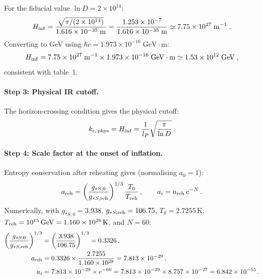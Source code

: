 For the fiducial value $\ln D = 2 \times 10^{14}$:
\begin{equation}
  H_{\rm inf} = \frac{\sqrt{\pi/(2\times 10^{14})}}{1.616\times 10^{-35}\;\mathrm{m}}
  = \frac{1.253\times 10^{-7}}{1.616\times 10^{-35}\;\mathrm{m}}
  \simeq 7.75\times 10^{27}\;\mathrm{m}^{-1} \;.
\end{equation}
Converting to GeV using $\hbar c = 1.973\times 10^{-16}\;\mathrm{GeV\cdot m}$:
\begin{equation}
  H_{\rm inf} = 7.75\times 10^{27}\;\mathrm{m}^{-1}
  \times 1.973\times 10^{-16}\;\mathrm{GeV\cdot m}
  \simeq 1.53\times 10^{12}\;\mathrm{GeV} \;,
\end{equation}
consistent with table~1.

\paragraph{Step 3: Physical IR cutoff.}
The horizon-crossing condition gives the physical cutoff:
\begin{equation}
  k_{c,\,\rm phys} = H_{\rm inf} = \frac{1}{l_P}\sqrt{\frac{\pi}{\ln D}}\,.
  \label{eq:app_kc_phys}
\end{equation}

\paragraph{Step 4: Scale factor at the onset of inflation.}
Entropy conservation after reheating gives (normalising $a_0 = 1$):
\begin{equation}
  a_{\rm reh} = \left(\frac{g_{*S,0}}{g_{*S,\rm reh}}\right)^{1/3}
  \frac{T_0}{T_{\rm reh}}\,,
  \qquad
  a_i = a_{\rm reh}\,e^{-N}\,.
\end{equation}
Numerically, with $g_{*S,0} = 3.938$, $g_{*S,\rm reh} = 106.75$,
$T_0 = 2.7255\,\mathrm{K}$, $T_{\rm reh} = 10^{15}\,\mathrm{GeV}
= 1.160\times 10^{28}\,\mathrm{K}$, and $N = 60$:
\begin{align}
  \left(\frac{g_{*S,0}}{g_{*S,\rm reh}}\right)^{1/3}
  &= \left(\frac{3.938}{106.75}\right)^{1/3} = 0.3326\,, \\
  a_{\rm reh} &= 0.3326 \times \frac{2.7255}{1.160\times 10^{28}}
  = 7.813\times 10^{-29}\,, \\
  a_i &= 7.813\times 10^{-29}\times e^{-60}
  = 7.813\times 10^{-29}\times 8.757\times 10^{-27}
  = 6.842\times 10^{-55}\,.
\end{align}

